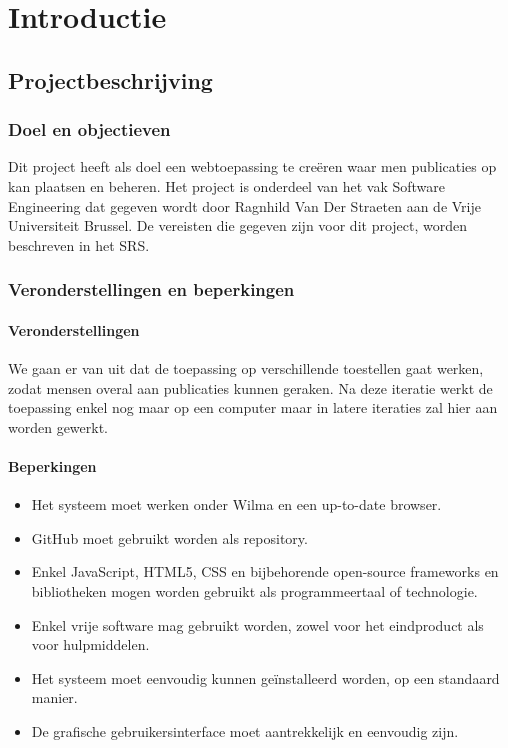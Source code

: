 \section{Introductie}



\subsection{Projectbeschrijving}
\subsubsection{Doel en objectieven}

Dit project heeft als doel een webtoepassing te creëren waar men publicaties op kan plaatsen en beheren.  Het project is onderdeel van het vak Software Engineering dat gegeven wordt door Ragnhild Van Der Straeten \cite{rvdstrae} aan de Vrije Universiteit Brussel. De vereisten die gegeven zijn voor dit project, worden beschreven in het SRS.

\subsubsection{Veronderstellingen en beperkingen}
\paragraph{Veronderstellingen}
We gaan er van uit dat de toepassing op verschillende toestellen gaat werken, zodat mensen overal aan publicaties kunnen geraken. Na deze iteratie werkt de toepassing enkel nog maar op een computer maar in latere iteraties zal hier aan worden gewerkt.

\paragraph{Beperkingen}
\begin{itemize}
\item Het systeem moet werken onder Wilma \cite{Wilma} en een up-to-date browser. %
\item GitHub \cite{GitHub} moet gebruikt worden als repository.
\item Enkel JavaScript, HTML5, CSS en bijbehorende open-source frameworks en bibliotheken mogen worden gebruikt als programmeertaal of technologie.
\item Enkel vrije software mag gebruikt worden, zowel voor het eindproduct als voor hulpmiddelen.
\item Het systeem moet eenvoudig kunnen ge\"installeerd worden, op een standaard manier.
\item De grafische gebruikersinterface moet aantrekkelijk en eenvoudig zijn.
\end{itemize}

